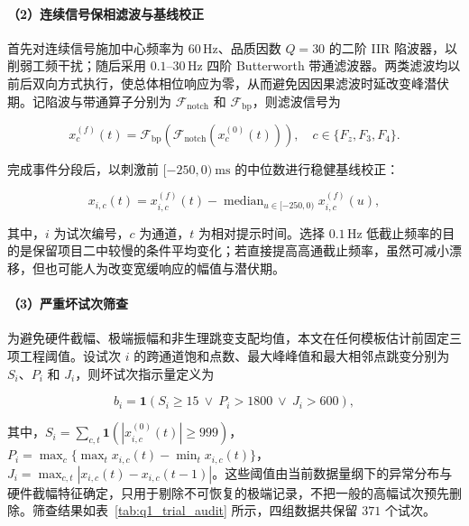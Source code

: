\documentclass[a4paper,zihao=-4,linespread=1]{ctexart}
\numberwithin{figure}{section}       %
\begin{document}
\paragraph{（2）连续信号保相滤波与基线校正}

首先对连续信号施加中心频率为 $60\,\mathrm{Hz}$、品质因数 $Q=30$ 的二阶 IIR 陷波器，以削弱工频干扰；随后采用 $0.1$--$30\,\mathrm{Hz}$ 四阶 Butterworth 带通滤波器。两类滤波均以前后双向方式执行，使总体相位响应为零，从而避免因因果滤波时延改变峰潜伏期。记陷波与带通算子分别为 $\mathcal{F}_{\mathrm{notch}}$ 和 $\mathcal{F}_{\mathrm{bp}}$，则滤波信号为

\begin{equation}
    x^{(f)}_c(t)=\mathcal{F}_{\mathrm{bp}}\!\left(\mathcal{F}_{\mathrm{notch}}\!\left(x^{(0)}_c(t)\right)\right),
    \quad c\in\{F_z,F_3,F_4\}.
    \label{eq:q1_filter}
\end{equation}

完成事件分段后，以刺激前 $[-250,0)~\mathrm{ms}$ 的中位数进行稳健基线校正：

\begin{equation}
    x_{i,c}(t)=x^{(f)}_{i,c}(t)-
    \mathop{\mathrm{median}}_{u\in[-250,0)}x^{(f)}_{i,c}(u),
    \label{eq:q1_baseline}
\end{equation}

其中，$i$ 为试次编号，$c$ 为通道，$t$ 为相对提示时间。选择 $0.1\,\mathrm{Hz}$ 低截止频率的目的是保留项目二中较慢的条件平均变化；若直接提高高通截止频率，虽然可减小漂移，但也可能人为改变宽缓响应的幅值与潜伏期。

\paragraph{（3）严重坏试次筛查}

为避免硬件截幅、极端振幅和非生理跳变支配均值，本文在任何模板估计前固定三项工程阈值。设试次 $i$ 的跨通道饱和点数、最大峰峰值和最大相邻点跳变分别为 $S_i$、$P_i$ 和 $J_i$，则坏试次指示量定义为

\begin{equation}
    b_i=\mathbf{1}\!\left(S_i\ge 15\ \lor\ P_i>1800\ \lor\ J_i>600\right),
    \label{eq:q1_badtrial}
\end{equation}

其中，$S_i=\sum_{c,t}\mathbf{1}(|x^{(0)}_{i,c}(t)|\ge999)$，$P_i=\max_c\{\max_t x_{i,c}(t)-\min_t x_{i,c}(t)\}$，$J_i=\max_{c,t}|x_{i,c}(t)-x_{i,c}(t-1)|$。这些阈值由当前数据量纲下的异常分布与硬件截幅特征确定，只用于剔除不可恢复的极端记录，不把一般的高幅试次预先删除。筛查结果如表~\ref{tab:q1_trial_audit} 所示，四组数据共保留 $371$ 个试次。
\end{document}

